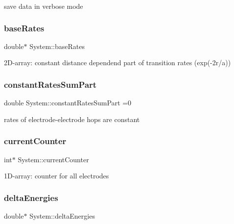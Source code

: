save data in verbose mode \mbox{\label{classSystem_a046174e3f233b5c31249aaec257c83ff}} 
\subsubsection{\texorpdfstring{base\+Rates}{baseRates}}
{\footnotesize\ttfamily double$\ast$ System\+::base\+Rates\hspace{0.3cm}{\ttfamily [private]}}

2\+D-\/array\+: constant distance dependend part of transition rates (exp(-\/2r/a)) \mbox{\label{classSystem_a51bded18390c13a28f8737c3b7a911bb}} 
\subsubsection{\texorpdfstring{constant\+Rates\+Sum\+Part}{constantRatesSumPart}}
{\footnotesize\ttfamily double System\+::constant\+Rates\+Sum\+Part =0\hspace{0.3cm}{\ttfamily [private]}}

rates of electrode-\/electrode hops are constant \mbox{\label{classSystem_a8d4858c73f66a84785384ff1fb741e7e}} 
\subsubsection{\texorpdfstring{current\+Counter}{currentCounter}}
{\footnotesize\ttfamily int$\ast$ System\+::current\+Counter\hspace{0.3cm}{\ttfamily [private]}}

1\+D-\/array\+: counter for all electrodes \mbox{\label{classSystem_aef68ee60ffd49b2beafde87dcf4a4fe3}} 
\subsubsection{\texorpdfstring{delta\+Energies}{deltaEnergies}}
{\footnotesize\ttfamily double$\ast$ System\+::delta\+Energies\hspace{0.3cm}{\ttfamily [private]}}

